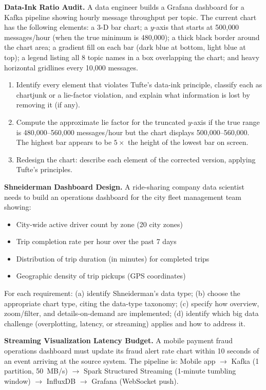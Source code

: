 \ap \textbf{Data-Ink Ratio Audit.}
A data engineer builds a Grafana dashboard for a Kafka pipeline showing
hourly message throughput per topic. The current chart has the following
elements: a 3-D bar chart; a $y$-axis that starts at 500{,}000 messages/hour
(when the true minimum is 480{,}000); a thick black border around the chart
area; a gradient fill on each bar (dark blue at bottom, light blue at top);
a legend listing all 8 topic names in a box overlapping the chart; and
heavy horizontal gridlines every 10{,}000 messages.
\begin{enumerate}[label=(\alph*)]
  \item Identify every element that violates Tufte's data-ink principle,
        classify each as chartjunk or a lie-factor violation, and explain
        what information is lost by removing it (if any).
  \item Compute the approximate lie factor for the truncated $y$-axis
        if the true range is 480{,}000--560{,}000 messages/hour but the
        chart displays 500{,}000--560{,}000. The highest bar appears to be
        $5\times$ the height of the lowest bar on screen.
  \item Redesign the chart: describe each element of the corrected
        version, applying Tufte's principles.
\end{enumerate}

\ap \textbf{Shneiderman Dashboard Design.}
A ride-sharing company data scientist needs to build an operations dashboard
for the city fleet management team showing:
\begin{itemize}
  \item City-wide active driver count by zone (20 city zones)
  \item Trip completion rate per hour over the past 7 days
  \item Distribution of trip duration (in minutes) for completed trips
  \item Geographic density of trip pickups (GPS coordinates)
\end{itemize}
For each requirement:
(a) identify Shneiderman's data type;
(b) choose the appropriate chart type, citing the data-type taxonomy;
(c) specify how overview, zoom/filter, and details-on-demand are implemented;
(d) identify which big data challenge (overplotting, latency, or streaming)
applies and how to address it.

\ap \textbf{Streaming Visualization Latency Budget.}
A mobile payment fraud operations dashboard must update its fraud alert
rate chart within 10 seconds of an event arriving at the source system.
The pipeline is: Mobile app $\to$ Kafka (1 partition, 50~MB/s)
$\to$ Spark Structured Streaming (1-minute tumbling window)
$\to$ InfluxDB $\to$ Grafana (WebSocket push).

